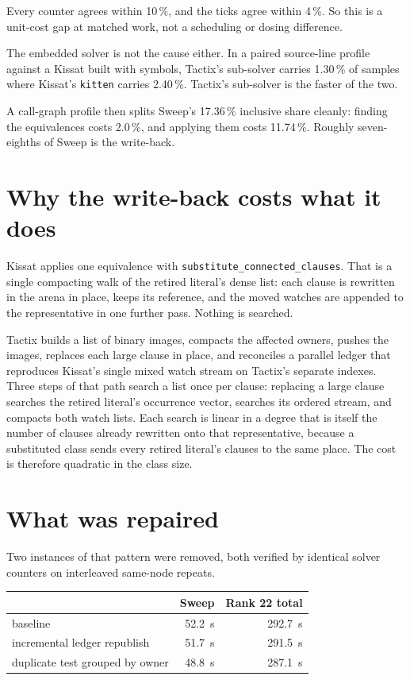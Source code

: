 \documentclass[11pt]{article}
\newcommand{\code}[1]{\texttt{#1}}
\begin{document}
Every counter agrees within 10\,\%, and the ticks agree within 4\,\%. So this
is a unit-cost gap at matched work, not a scheduling or dosing difference.

The embedded solver is not the cause either. In a paired source-line profile
against a Kissat built with symbols, Tactix's sub-solver carries 1.30\,\% of
samples where Kissat's \code{kitten} carries 2.40\,\%. Tactix's sub-solver is
the faster of the two.

A call-graph profile then splits Sweep's 17.36\,\% inclusive share cleanly:
finding the equivalences costs 2.0\,\%, and applying them costs 11.74\,\%.
Roughly seven-eighths of Sweep is the write-back.

\section{Why the write-back costs what it does}

Kissat applies one equivalence with \code{substitute\_connected\_clauses}. That
is a single compacting walk of the retired literal's dense list: each clause is
rewritten in the arena in place, keeps its reference, and the moved watches are
appended to the representative in one further pass. Nothing is searched.

Tactix builds a list of binary images, compacts the affected owners, pushes the
images, replaces each large clause in place, and reconciles a parallel ledger
that reproduces Kissat's single mixed watch stream on Tactix's separate
indexes. Three steps of that path search a list once per clause: replacing a
large clause searches the retired literal's occurrence vector, searches its
ordered stream, and compacts both watch lists. Each search is linear in a
degree that is itself the number of clauses already rewritten onto that
representative, because a substituted class sends every retired literal's
clauses to the same place. The cost is therefore quadratic in the class size.

\section{What was repaired}

Two instances of that pattern were removed, both verified by identical solver
counters on interleaved same-node repeats.

\begin{center}
\begin{tabular}{lrr}
\toprule
 & Sweep & Rank 22 total \\
\midrule
baseline                          & 52.2~s & 292.7~s \\
incremental ledger republish      & 51.7~s & 291.5~s \\
duplicate test grouped by owner   & 48.8~s & 287.1~s \\
\bottomrule
\end{tabular}
\end{center}
\end{document}
